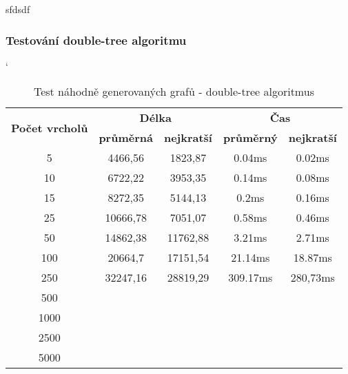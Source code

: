 \documentclass[
  printversion=false,
  joinlists=true,
  glossaries=true,
  figures=true,
  tables=true,
  sourcecodes=false,
  theorems=false,
  bibencoding=utf8,
  language=czech,
  encoding=utf8,
  program=infpvs,
  index=true,
  biblatex=true
]{kidiplom}
\begin{document}
sfdsdf

\subsubsection{Testování double-tree algoritmu}
\begin{table}[H]
\catcode`
\centering
\begin{tabular}{|c|c|c|c|c|}
\hline
\multirow{2}{*}{\textbf{Počet vrcholů}} & \multicolumn{2}{c|}{\textbf{Délka}}                                              & \multicolumn{2}{c|}{\textbf{Čas}} \\ \cline{2-5}
& \textbf{průměrná} & \textbf{nejkratší} & \textbf{průměrný} & \textbf{nejkratší} \\
\hline
5                      & 4466,56                 & 1823,87                  & 0.04ms                & 0.02ms                 \\
10                     & 6722,22                 & 3953,35                  & 0.14ms                & 0.08ms                 \\
15                     & 8272,35                 & 5144,13                  & 0.2ms                 & 0.16ms                 \\
25                     & 10666,78                & 7051,07                  & 0.58ms                & 0.46ms                 \\
50                     & 14862,38                & 11762,88                 & 3.21ms                & 2.71ms                 \\
100                    & 20664,7                 & 17151,54                 & 21.14ms               & 18.87ms                \\
250                    & 32247,16                & 28819,29                 & 309.17ms              & 280,73ms               \\
500                    &                         &                          &                       &                        \\
1000                   &                         &                          &                       &                        \\
2500                   &                         &                          &                       &                        \\
5000                   &                         &                          &                       &                        \\ \hline
\end{tabular}
\caption{Test náhodně generovaných grafů - double-tree algoritmus}
\end{table}
\end{document}
